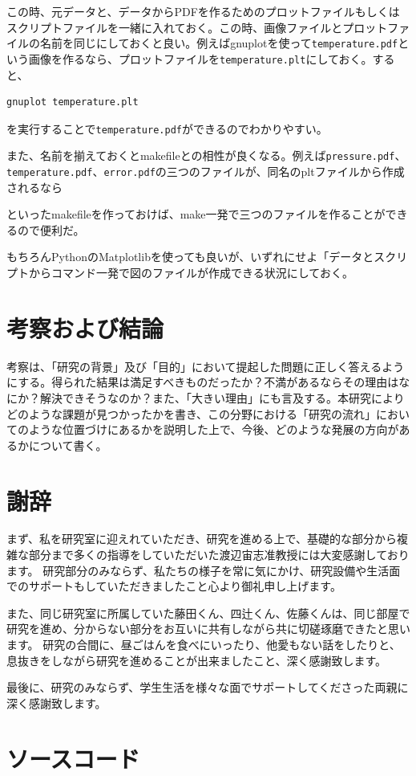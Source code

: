 \documentclass[titlepage]{jsreport}
\begin{document}
この時、元データと、データからPDFを作るためのプロットファイルもしくはスクリプトファイルを一緒に入れておく。この時、画像ファイルとプロットファイルの名前を同じにしておくと良い。例えばgnuplotを使って\verb|temperature.pdf|という画像を作るなら、プロットファイルを\verb|temperature.plt|にしておく。すると、

\begin{lstlisting}[language=bash]
gnuplot temperature.plt
\end{lstlisting}

を実行することで\verb|temperature.pdf|ができるのでわかりやすい。

また、名前を揃えておくとmakefileとの相性が良くなる。例えば\verb|pressure.pdf|、\verb|temperature.pdf|、\verb|error.pdf|の三つのファイルが、同名のpltファイルから作成されるなら



といったmakefileを作っておけば、make一発で三つのファイルを作ることができるので便利だ。

もちろんPythonのMatplotlibを使っても良いが、いずれにせよ「データとスクリプトからコマンド一発で図のファイルが作成できる状況にしておく。

\chapter{考察および結論} \label{chap:summary}

考察は、「研究の背景」及び「目的」において提起した問題に正しく答えるようにする。得られた結果は満足すべきものだったか？不満があるならその理由はなにか？解決できそうなのか？また、「大きい理由」にも言及する。本研究によりどのような課題が見つかったかを書き、この分野における「研究の流れ」においてのような位置づけにあるかを説明した上で、今後、どのような発展の方向があるかについて書く。

\chapter*{謝辞}

まず、私を研究室に迎えれていただき、研究を進める上で、基礎的な部分から複雑な部分まで多くの指導をしていただいた渡辺宙志准教授には大変感謝しております。
研究部分のみならず、私たちの様子を常に気にかけ、研究設備や生活面でのサポートもしていただきましたこと心より御礼申し上げます。

また、同じ研究室に所属していた藤田くん、四辻くん、佐藤くんは、同じ部屋で研究を進め、分からない部分をお互いに共有しながら共に切磋琢磨できたと思います。
研究の合間に、昼ごはんを食べにいったり、他愛もない話をしたりと、息抜きをしながら研究を進めることが出来ましたこと、深く感謝致します。

最後に、研究のみならず、学生生活を様々な面でサポートしてくださった両親に深く感謝致します。


\appendix

\chapter{ソースコード}





\end{document}
